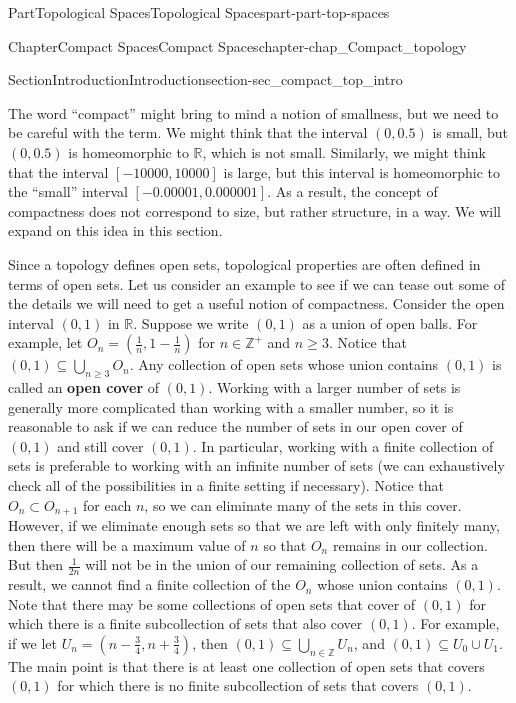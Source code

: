 \documentclass[oneside,10pt,]{book}
\newcommand{\terminology}[1]{\textbf{#1}}
\numberwithin{equation}{chapter}
\newcommand{\Z}{\mathbb{Z}}
\newcommand{\R}{\mathbb{R}}
\begin{document}
\begin{partptx}{Part}{Topological Spaces}{}{Topological Spaces}{}{}{part-part-top-spaces}
\begin{chapterptx}{Chapter}{Compact Spaces}{}{Compact Spaces}{}{}{chapter-chap_Compact_topology}
\begin{sectionptx}{Section}{Introduction}{}{Introduction}{}{}{section-sec_compact_top_intro}
\par
The word ``compact'' might bring to mind a notion of smallness, but we need to be careful with the term. We might think that the interval \((0, 0.5)\) is small, but \((0, 0.5)\) is homeomorphic to \(\R\), which is not small. Similarly, we might think that the interval \([-10000, 10000]\) is large, but this interval is homeomorphic to the ``small'' interval \([-0.00001, 0.000001]\). As a result, the concept of compactness does not correspond to size, but rather structure, in a way. We will expand on this idea in this section.%
\par
Since a topology defines open sets, topological properties are often defined in terms of open sets. Let us consider an example to see if we can tease out some of the details we will need to get a useful notion of compactness. Consider the open interval \((0, 1)\) in \(\R\). Suppose we write \((0, 1)\) as a union of open balls. For example, let \(O_n = \left(\frac{1}{n}, 1-\frac{1}{n}\right)\) for \(n \in \Z^+\) and \(n \geq 3\). Notice that \((0, 1) \subseteq \bigcup_{n \geq 3} O_n\). Any collection of open sets whose union contains \((0, 1)\) is called an \terminology{open cover} of \((0, 1)\). Working with a larger number of sets is generally more complicated than working with a smaller number, so it is reasonable to ask if we can reduce the number of sets in our open cover of \((0, 1)\) and still cover \((0, 1)\). In particular, working with a finite collection of sets is preferable to working with an infinite number of sets (we can exhaustively check all of the possibilities in a finite setting if necessary). Notice that \(O_n \subset O_{n+1}\) for each \(n\), so we can eliminate many of the sets in this cover. However, if we eliminate enough sets so that we are left with only finitely many, then there will be a maximum value of \(n\) so that \(O_n\) remains in our collection. But then \(\frac{1}{2n}\) will not be in the union of our remaining collection of sets. As a result, we cannot find a finite collection of the \(O_n\) whose union contains \((0, 1)\). Note that there may be some collections of open sets that cover of \((0,1)\) for which there is a finite subcollection of sets that also cover \((0,1)\). For example, if we let \(U_n = \left(n-\frac{3}{4}, n+\frac{3}{4}\right)\), then \((0,1) \subseteq \bigcup_{n \in \Z} U_n\), and \((0,1) \subseteq U_{0} \cup U_1\). The main point is that there is at least one collection of open sets that covers \((0,1)\) for which there is no finite subcollection of sets that covers \((0,1)\).%
\par

\end{sectionptx}
\end{chapterptx}
\end{partptx}
\end{document}
